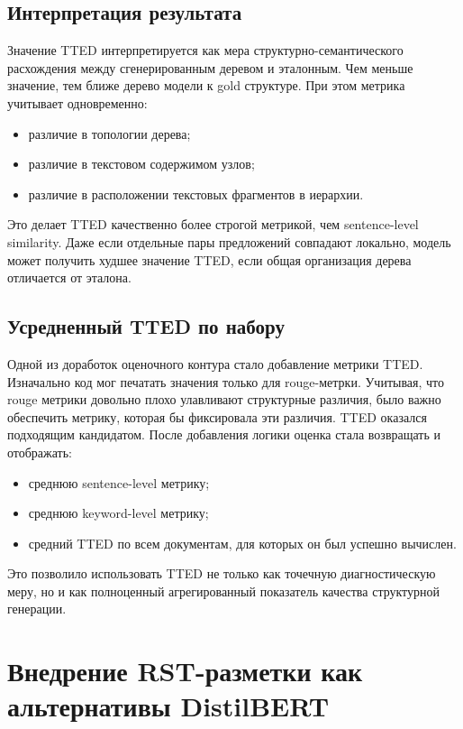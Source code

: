 \documentclass[12pt,a4paper]{article}
\begin{document}
\subsection{Интерпретация результата}

Значение TTED интерпретируется как мера структурно-семантического расхождения между
сгенерированным деревом и эталонным. Чем меньше значение, тем ближе дерево модели к gold
структуре. При этом метрика учитывает одновременно:

\begin{itemize}
    \item различие в топологии дерева;
    \item различие в текстовом содержимом узлов;
    \item различие в расположении текстовых фрагментов в иерархии.
\end{itemize}

Это делает TTED качественно более строгой метрикой, чем sentence-level similarity. Даже
если отдельные пары предложений совпадают локально, модель может получить худшее значение
TTED, если общая организация дерева отличается от эталона.

\subsection{Усредненный TTED по набору}

Одной из доработок оценочного контура стало добавление метрики TTED. Изначально код
мог печатать значения только для rouge-метрки. Учитывая, что rouge метрики довольно плохо
улавливают структурные различия, было важно обеспечить метрику, которая бы фиксировала эти различия. 
TTED оказался подходящим кандидатом.
После добавления логики оценка стала возвращать и отображать:

\begin{itemize}
    \item среднюю sentence-level метрику;
    \item среднюю keyword-level метрику;
    \item средний TTED по всем документам, для которых он был успешно вычислен.
\end{itemize}

Это позволило использовать TTED не только как точечную диагностическую меру, но и как
полноценный агрегированный показатель качества структурной генерации.

\section{Внедрение RST-разметки как альтернативы DistilBERT}
\end{document}
